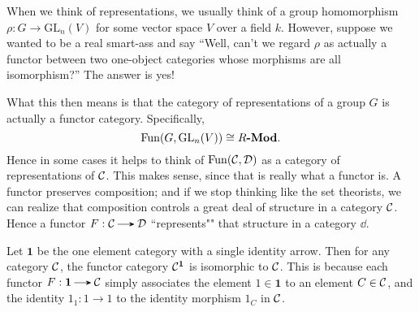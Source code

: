     When we think of 
    representations, we usually think of a group homomorphism $\rho: G \to \text{GL}_n(V)$ 
    for some vector space $V$ over a field $k$. However, suppose we wanted to be 
    a real smart-ass and say ``Well, can't we regard $\rho$ as actually a functor 
    between two one-object categories whose morphisms are all isomorphism?''
    The answer is yes! 

    What this then means is that the category of representations of a group $G$
    is actually a functor category. Specifically, 
    \[
        \operatorname{\mathrm{Fun}}(G, \text{GL}_n(V)) \cong R\textbf{-Mod}.
    \]
    Hence in some cases it helps to think of $\operatorname{\mathrm{Fun}}(\mathcal{C}, \mathcal{D})$ as a 
    category of representations of $\mathcal{C}$. This makes sense, since that is really 
    what a functor is. A functor preserves composition; and if we stop thinking 
    like the set theorists, we can realize that composition controls a great deal 
    of structure 
    in a category $\mathcal{C}$. Hence a functor $F: \cc \to \dd$ ``represents"" that structure in a 
    category $\dd$. 

    \begin{example}
        Let $\bm{1}$ be the one element category with a
        single identity arrow. Then for any category $\mathcal{C}$, the
        functor category $\mathcal{C}^{\bm{1}}$ is isomorphic to $\mathcal{C}$. This
        is because each functor $F: \bm{1} \to \cc$ simply associates
        the element $1 \in \bm{1}$ to an element $C \in \mathcal{C}$, and the
        identity $1_1: 1 \to 1$ to the identity morphism $1_C$ in
        $\mathcal{C}$. 
    \end{example}


